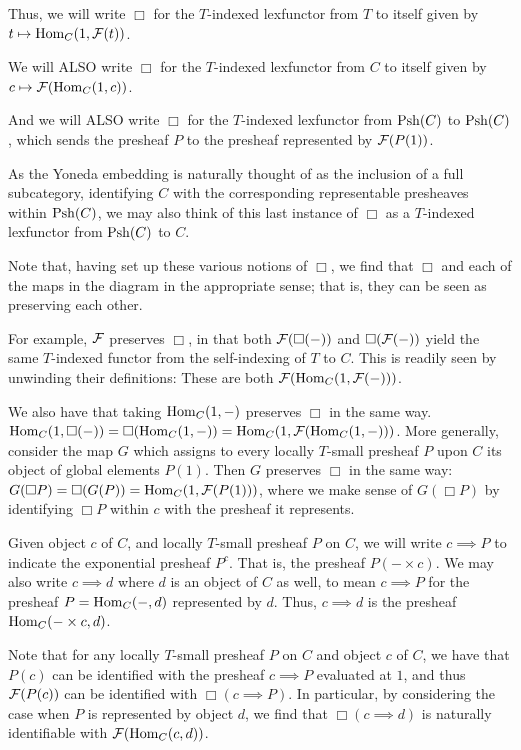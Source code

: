 Thus, we will write $\Box$ for the $T$-indexed lexfunctor from $T$ to itself given by $t \mapsto \operatorname{Hom}_C(1, \mathcal{F}(t))$.

We will ALSO write $\Box$ for the $T$-indexed lexfunctor from $C$ to itself given by $c \mapsto \mathcal{F}(\operatorname{Hom}_C(1, c))$.

And we will ALSO write $\Box$ for the $T$-indexed lexfunctor from $\operatorname{Psh}(C)$ to $\operatorname{Psh}(C)$, which sends the presheaf $P$ to the presheaf represented by $\mathcal{F}(P(1))$.

As the Yoneda embedding is naturally thought of as the inclusion of a full subcategory, identifying $C$ with the corresponding representable presheaves within $\operatorname{Psh}(C)$, we may also think of this last instance of $\Box$ as a $T$-indexed lexfunctor from $\operatorname{Psh}(C)$ to $C$.

Note that, having set up these various notions of $\Box$, we find that $\Box$ and each of the maps in the diagram  in the appropriate sense; that is, they can be seen as preserving each other.

For example, $\mathcal{F}$ preserves $\Box$, in that both $\mathcal{F}(\Box(-))$ and $\Box(\mathcal{F}(-))$ yield the same $T$-indexed functor from the self-indexing of $T$ to $C$. This is readily seen by unwinding their definitions: These are both $\mathcal{F}(\operatorname{Hom}_C(1, \mathcal{F}(-)))$.

We also have that taking $\operatorname{Hom}_C(1, -)$ preserves $\Box$ in the same way. $\operatorname{Hom}_C(1, \Box(-)) = \Box(\operatorname{Hom}_C(1, -)) = \operatorname{Hom}_C(1, \mathcal{F}(\operatorname{Hom}_C(1, -)))$. More generally, consider the map $G$ which assigns to every locally $T$-small presheaf $P$ upon $C$ its object of global elements $P(1)$. Then $G$ preserves $\Box$ in the same way: $G(\Box P) = \Box(G(P)) = \operatorname{Hom}_C(1, \mathcal{F}(P(1)))$, where we make sense of $G(\Box P)$ by identifying $\Box P$ within $c$ with the presheaf it represents.

Given object $c$ of $C$, and locally $T$-small presheaf $P$ on $C$, we will write $c \implies P$ to indicate the exponential presheaf $P^c$. That is, the presheaf $P(- \times c)$. We may also write $c \implies d$ where $d$ is an object of $C$ as well, to mean $c \implies P$ for the presheaf $P = \operatorname{Hom}_C(-, d)$ represented by $d$. Thus, $c \implies d$ is the presheaf $\operatorname{Hom}_C(- \times c, d)$.

Note that for any locally $T$-small presheaf $P$ on $C$ and object $c$ of $C$, we have that $P(c)$ can be identified with the presheaf $c \implies P$ evaluated at $1$, and thus $\mathcal{F}(P(c))$ can be identified with $\Box(c \implies P)$. In particular, by considering the case when $P$ is represented by object $d$, we find that $\Box(c \implies d)$ is naturally identifiable with $\mathcal{F}(\operatorname{Hom}_C(c, d))$.

